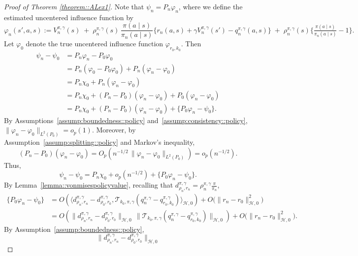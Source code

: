\documentclass[11pt]{article}
\theoremstyle{plain}
\begin{document}
 
\begin{proof}[Proof of Theorem \ref{theorem::ALex1}]
Note that $\psi_n = P_n \varphi_n$, where we define the estimated uncentered influence function by
\[
\varphi_n(s', a, s)
:= V_n^{\pi, \gamma}(s)  
\;+\; \rho_n^{\pi,\gamma}(s)\,\frac{\pi(a \mid s)}{\pi_n(a \mid s)}
    \big\{r_n(a, s) + \gamma V_n^{\pi, \gamma}(s') - q_n^{\pi,\gamma}(a, s)\big\}
\;+\; \rho_n^{\pi,\gamma}(s)\Big\{\tfrac{\pi(a \mid s)}{\pi_n(a \mid s)}-1\Big\}.
\]
Let $\varphi_0$ denote the true uncentered influence function $\varphi_{r_0, k_0}$. Then
\begin{align*}
    \psi_n - \psi_0
    &= P_n \varphi_n - P_0 \varphi_0 \\
    &= P_n(\varphi_0 - P_0 \varphi_0) + P_n(\varphi_n - \varphi_0) \\
    &= P_n \chi_0 + P_n(\varphi_n - \varphi_0) \\
    &= P_n \chi_0 + (P_n - P_0)(\varphi_n - \varphi_0) + P_0(\varphi_n - \varphi_0) \\
    &= P_n \chi_0 + (P_n - P_0)(\varphi_n - \varphi_0) + \{P_0 \varphi_n - \psi_0\}.
\end{align*}
By Assumptions~\ref{assump:boundedness::policy} and~\ref{assump:consistency::policy},  
$\|\varphi_n - \varphi_0\|_{L^2(P_0)} = o_p(1)$. Moreover, by
Assumption~\ref{assump:splitting::policy} and Markov’s inequality,
\[
(P_n - P_0)(\varphi_n - \varphi_0)
= O_p\!\left(n^{-1/2}\,\|\varphi_n - \varphi_0\|_{L^2(P_0)}\right)
= o_p(n^{-1/2}).
\]
Thus,
\[
\psi_n - \psi_0
= P_n \chi_0 + o_p(n^{-1/2}) + \{P_0 \varphi_n - \psi_0\}.
\]
By Lemma~\ref{lemma::vonmisespolicyvalue}, recalling that  
$d_{\rho_n, r_n}^{\pi,\gamma} = \rho_n^{\pi,\gamma}\tfrac{\pi}{\pi_n}$,
\begin{align*}
   \{P_0 \varphi_n - \psi_0\}
   &= O\!\left(
       \big\langle
          d_{\rho_n, r_n}^{\pi,\gamma} - d_{\rho_0, r_0}^{\pi,\gamma},
          \mathcal{T}_{k_0,\pi,\gamma}(q_n^{\pi,\gamma} - q_{r_0, k_0}^{\pi,\gamma})
       \big\rangle_{\mathcal{H}, 0}
     \right)
     + O\bigl(\|r_n - r_0\|_{\mathcal{H}, 0}^2\bigr) \\
   &= O\!\left(
       \|d_{\rho_n, r_n}^{\pi,\gamma} - d_{\rho_0, r_0}^{\pi,\gamma}\|_{\mathcal{H}, 0}\,
       \|\mathcal{T}_{k_0,\pi,\gamma}(q_n^{\pi,\gamma} - q_{r_0, k_0}^{\pi,\gamma})\|_{\mathcal{H}, 0}
     \right)
     + O\bigl(\|r_n - r_0\|_{\mathcal{H}, 0}^2\bigr).
\end{align*}
By Assumption~\ref{assump:boundedness::policy},
\[
\|d_{\rho_n, r_n}^{\pi,\gamma} - d_{\rho_0, r_0}^{\pi,\gamma}\|_{\mathcal{H}, 0}
\]
\end{proof}
\end{document}
